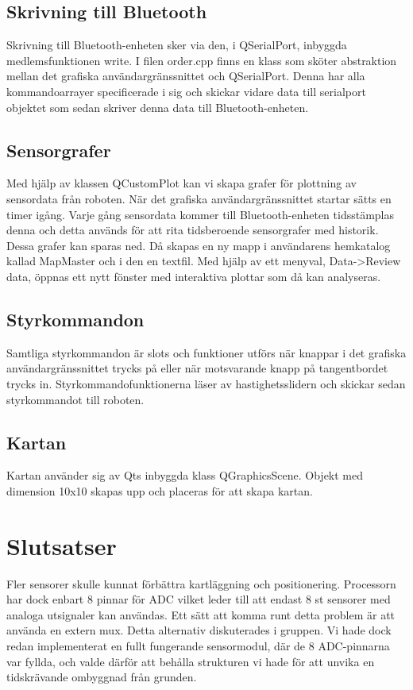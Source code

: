 \documentclass[a4paper,12pt,fleqn]{article}
\begin{document}
\subsection{Skrivning till Bluetooth}
Skrivning till Bluetooth-enheten sker via den, i QSerialPort, inbyggda medlemsfunktionen write. I filen order.cpp finns en klass som sköter abstraktion mellan det grafiska användargränssnittet och QSerialPort. Denna har alla kommandoarrayer specificerade i sig och skickar vidare data till serialport objektet som sedan skriver denna data till Bluetooth-enheten. 

\subsection{Sensorgrafer}
Med hjälp av klassen QCustomPlot kan vi skapa grafer för plottning av sensordata från roboten. När det grafiska användargränssnittet startar sätts en timer igång. Varje gång sensordata kommer till Bluetooth-enheten tidsstämplas denna och detta används för att rita tidsberoende sensorgrafer med historik. 
Dessa grafer kan sparas ned. Då skapas en ny mapp i användarens hemkatalog kallad MapMaster och i den en textfil. Med hjälp av ett menyval, Data->Review data, öppnas ett nytt fönster med interaktiva plottar som då kan analyseras.

\subsection{Styrkommandon}
Samtliga styrkommandon är slots och funktioner utförs när knappar i det grafiska användargränssnittet trycks på eller när motsvarande knapp på tangentbordet trycks in. 
Styrkommandofunktionerna läser av hastighetsslidern och skickar sedan styrkommandot till roboten. 
\subsection{Kartan}
Kartan använder sig av Qts inbyggda klass QGraphicsScene. Objekt med dimension 10x10 skapas upp och placeras för att skapa kartan.

\section{Slutsatser}
Fler sensorer skulle kunnat förbättra kartläggning och positionering. Processorn har dock enbart 8 pinnar för ADC vilket leder till att endast 8 st sensorer med analoga utsignaler kan användas. Ett sätt att komma runt detta problem är att använda en extern mux.
Detta alternativ diskuterades i gruppen. Vi hade dock redan implementerat en fullt fungerande sensormodul, där de 8 ADC-pinnarna var fyllda, och valde därför att behålla strukturen vi hade för att unvika en tidskrävande ombyggnad från grunden.
\end{document}
